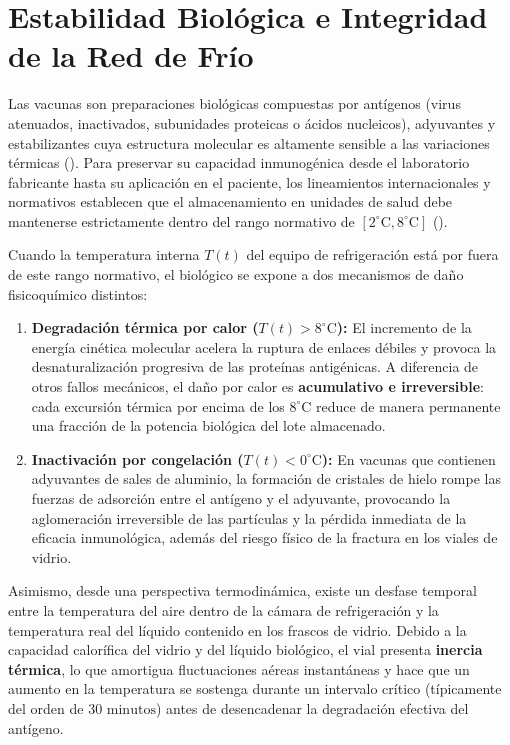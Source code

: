 \documentclass[
  spanish,
  us-letterpaper,
]{scrreprt}
\providecommand{\tightlist}{%
  \setlength{\itemsep}{0pt}\setlength{\parskip}{0pt}}
\numberwithin{equation}{section}
\theoremstyle{plain}
\theoremstyle{plain}
\theoremstyle{definition}
\theoremstyle{plain}
\theoremstyle{remark}
\begin{document}
\section{Estabilidad Biológica e Integridad de la Red de
Frío}\label{estabilidad-bioluxf3gica-e-integridad-de-la-red-de-fruxedo}

Las vacunas son preparaciones biológicas compuestas por antígenos (virus
atenuados, inactivados, subunidades proteicas o ácidos nucleicos),
adyuvantes y estabilizantes cuya estructura molecular es altamente
sensible a las variaciones térmicas
(). Para
preservar su capacidad inmunogénica desde el laboratorio fabricante
hasta su aplicación en el paciente, los lineamientos internacionales y
normativos establecen que el almacenamiento en unidades de salud debe
mantenerse estrictamente dentro del rango normativo de
\([2^\circ\text{C}, 8^\circ\text{C}]\)
().

Cuando la temperatura interna \(T(t)\) del equipo de refrigeración está
por fuera de este rango normativo, el biológico se expone a dos
mecanismos de daño fisicoquímico distintos:

\begin{enumerate}
\def\labelenumi{\arabic{enumi}.}
\tightlist
\item
  \textbf{Degradación térmica por calor (\(T(t) > 8^\circ\text{C}\)):}
  El incremento de la energía cinética molecular acelera la ruptura de
  enlaces débiles y provoca la desnaturalización progresiva de las
  proteínas antigénicas. A diferencia de otros fallos mecánicos, el daño
  por calor es \textbf{acumulativo e irreversible}: cada excursión
  térmica por encima de los \(8^\circ\text{C}\) reduce de manera
  permanente una fracción de la potencia biológica del lote almacenado.
\item
  \textbf{Inactivación por congelación (\(T(t) < 0^\circ\text{C}\)):} En
  vacunas que contienen adyuvantes de sales de aluminio, la formación de
  cristales de hielo rompe las fuerzas de adsorción entre el antígeno y
  el adyuvante, provocando la aglomeración irreversible de las
  partículas y la pérdida inmediata de la eficacia inmunológica, además
  del riesgo físico de la fractura en los viales de vidrio.
\end{enumerate}

Asimismo, desde una perspectiva termodinámica, existe un desfase
temporal entre la temperatura del aire dentro de la cámara de
refrigeración y la temperatura real del líquido contenido en los frascos
de vidrio. Debido a la capacidad calorífica del vidrio y del líquido
biológico, el vial presenta \textbf{inercia térmica}, lo que amortigua
fluctuaciones aéreas instantáneas y hace que un aumento en la
temperatura se sostenga durante un intervalo crítico (típicamente del
orden de \(30\text{ minutos}\)) antes de desencadenar la degradación
efectiva del antígeno.
\end{document}
